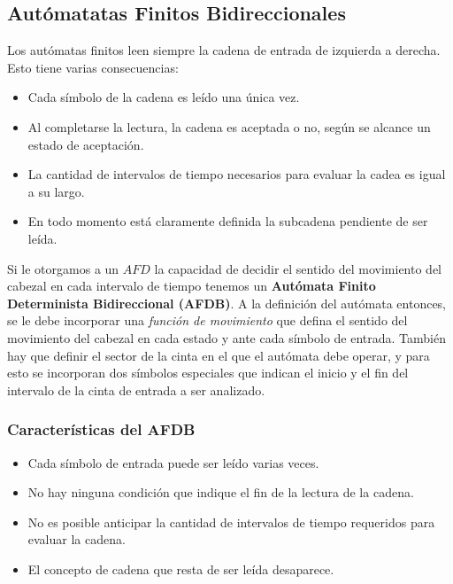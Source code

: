 \documentclass[12pt]{article}
\begin{document}
\subsection{Autómatatas Finitos Bidireccionales}
Los autómatas finitos leen siempre la cadena de entrada de izquierda a derecha. Esto tiene varias consecuencias:
\begin{itemize}
  \item Cada símbolo de la cadena es leído una única vez.

  \item Al completarse la lectura, la cadena es aceptada o no, según se alcance un estado de aceptación.

  \item La cantidad de intervalos de tiempo necesarios para evaluar la cadea es igual a su largo.

  \item En todo momento está claramente definida la subcadena pendiente de ser leída.
\end{itemize}

Si le otorgamos a un $ AFD $ la capacidad de decidir el sentido del movimiento del cabezal en cada intervalo de tiempo tenemos un \textbf{Autómata Finito Determinista Bidireccional (AFDB)}. A la definición del autómata entonces, se le debe incorporar una \textit{función de movimiento} que defina el sentido del movimiento del cabezal en cada estado y ante cada símbolo de entrada. También hay que definir el sector de la cinta en el que el autómata debe operar, y para esto se incorporan dos símbolos especiales que indican el inicio y el fin del intervalo de la cinta de entrada a ser analizado.

\subsubsection{Características del AFDB}
\begin{itemize}
  \item Cada símbolo de entrada puede ser leído varias veces.

  \item No hay ninguna condición que indique el fin de la lectura de la cadena.

  \item No es posible anticipar la cantidad de intervalos de tiempo requeridos para evaluar la cadena.

  \item El concepto de cadena que resta de ser leída desaparece.
\end{itemize}
\end{document}
